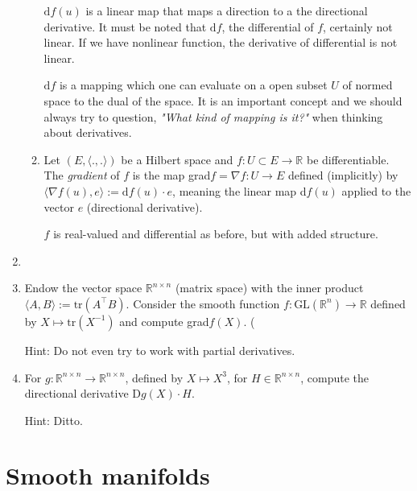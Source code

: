 \documentclass{article}
\begin{document}
\begin{enumerate}[start=9]
\begin{enumerate}
\begin{ans_box}
      $\text{d}f(u)$ is a linear map that maps a direction to a the directional derivative. It must be noted that $\text{d}f$, the differential of $f$, certainly not linear. If we have nonlinear function, the derivative of differential is not linear.\medskip

      $\text{d}f$ is a mapping which one can evaluate on a open subset $U$ of normed space to the dual of the space. It is an important concept and we should always try to question, \textit{"What kind of mapping is it?"} when thinking about derivatives.
    \end{ans_box}

    \item Let $(E, \langle.,.\rangle)$ be a Hilbert space and $f:U\subset E\rightarrow\mathbb{R}$ be differentiable. The \textit{gradient} of $f$ is the map grad$f=\nabla f:U\rightarrow E$ defined (implicitly) by $\langle\nabla f(u), e\rangle:=\text{d}f(u)\cdot e$, meaning the linear map d$f(u)$ applied to the vector $e$ (directional derivative).

    \begin{ans_box}
      $f$ is real-valued and differential as before, but with added structure.
    \end{ans_box}
  \end{enumerate}

  \item

  \item Endow the vector space $\mathbb{R}^{n\times n}$ (matrix space) with the inner product $\langle A,B\rangle:=\text{tr}(A^{\top}B)$. Consider the smooth function $f:\text{GL}(\mathbb{R}^{n})\rightarrow\mathbb{R}$ defined by $X\mapsto\text{tr}(X^{-1})$ and compute grad$f(X)$. (

  {\footnotesize Hint: Do not even try to work with partial derivatives.}

  \item For $g:\mathbb{R}^{n\times n}\rightarrow\mathbb{R}^{n\times n}$, defined by $X\mapsto X^{3}$, for $H\in\mathbb{R}^{n\times n}$, compute the directional derivative D$g(X)\cdot H$.

  {\footnotesize Hint: Ditto.}
\end{enumerate}

\section{Smooth manifolds}
\end{document}
